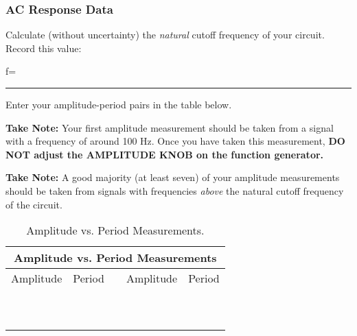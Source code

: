 \subsubsection{AC Response Data}

Calculate (without uncertainty) the {\it natural} cutoff frequency of your circuit.
Record this value:

\begin{center}
f=~ \rule{3cm}{.1mm}
\end{center}

\noindent
Enter your amplitude-period pairs in the table below. 

\noindent
{\bf Take Note:} Your first amplitude measurement should be taken from a signal with
a frequency of around 100 Hz. Once you have taken this measurement, {\bf DO NOT adjust
the AMPLITUDE KNOB on the function generator.} 

\noindent
{\bf Take Note:} A good majority (at least seven) of your amplitude 
measurements should be taken from signals with frequencies {\it above} the natural 
cutoff frequency of the circuit.

\begin{table}[htb]
\begin{center}
\begin{tabular}{|c|c|c|c|c|}
\hline
\multicolumn{5}{|c|}{Amplitude vs. Period Measurements} \\
\hline
Amplitude & Period & & Amplitude & Period \\
\hline
\hspace*{3cm} & \hspace*{3cm} & \hspace*{.1cm} & \hspace*{3cm} & \hspace*{3cm} \\
& & & & \\
\hline
& & & & \\
& & & & \\
\hline
& & & & \\
& & & & \\
\hline
& & & & \\
& & & & \\
\hline
& & & & \\
& & & & \\
\hline

\end{tabular}
\end{center}
\caption{Amplitude vs. Period Measurements.}
\label{tab:RC:lowpass}
\end{table}

